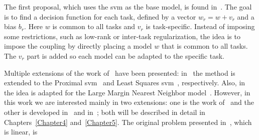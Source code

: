 The first proposal, which uses the \acrshort{svm} as the base model, is found in~\cite{EvgeniouP04}. The goal is to find a decision function for each task, defined by a vector
$w_r = w + v_r$
and a bias $b_r$.
Here $w$ is common to all tasks and $v_r$ is task-specific.
Instead of imposing some restrictions, such as low-rank or inter-task regularization, the idea is to impose the coupling by directly placing a model $w$ that is common to all tasks. The $v_r$ part is added so each model can be adapted to the specific task.
%

Multiple extensions of the work of~\cite{EvgeniouP04} have been presented: in~\cite{XuAQZ14, LiTST15} the method is extended to the Proximal \acrshort{svm}~\citep{FungM01} and Least Squares \acrshort{svm}~\citep{SuykensV99}, respectively. Also, in~\cite{ParameswaranW10} the idea is adapted for the Large Margin Nearest Neighbor model~\citep{WeinbergerS09}.
%
However, in this work we are interested mainly in two extensions: one is the work of~\cite{EvgeniouMP05} and the other is developed in~\cite{LiangC08} and in~\cite{CaiC09}; both will be described in detail in Chapters~\ref{Chapter4} and~\ref{Chapter5}.
The original problem presented in~\citet{EvgeniouP04}, which is linear, is

